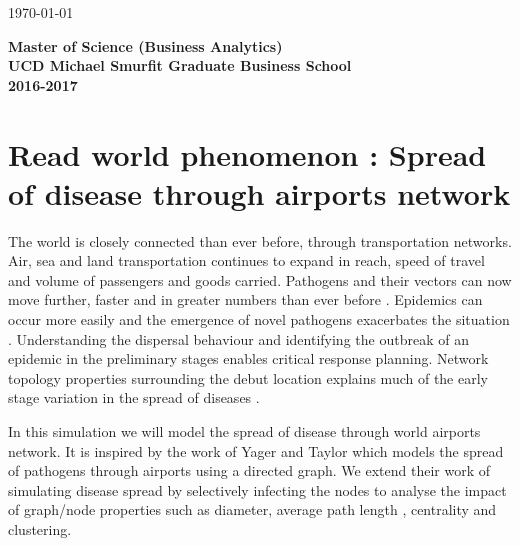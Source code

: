 \documentclass[a4paper,11pt]{article}
\begin{document}
\begin{titlepage}
{\large \today}\\[3cm] %


 

{

	 \vspace{1.5in}\textmd{\textbf{Master of Science (Business Analytics)}}\\
     \large{\textbf{UCD Michael Smurfit Graduate Business School }}\\
      \textmd{\textbf{2016-2017}}\\
 }     
\vfill %

\end{titlepage}






\section{Read world phenomenon : Spread of disease through airports network} 


The world is closely connected than ever before, through transportation networks. Air, sea and land transportation continues to expand in reach, speed of travel and volume of passengers and goods carried. Pathogens and their vectors can now move further, faster and in greater numbers than ever before \cite{tatem2006global}. Epidemics can occur more easily and the emergence of novel pathogens exacerbates the situation \cite{jones2008global}. Understanding the dispersal behaviour and identifying the outbreak of an epidemic in the preliminary stages enables critical response planning. Network topology properties surrounding the debut location explains much of the early stage variation in the spread of diseases \cite{lawyer2016measuring}.

In this simulation we will model the spread of disease through world airports network. It is inspired by the work of Yager and Taylor \cite{nicholasyager2014} which models the spread of pathogens through airports using a directed graph. We extend their work of simulating disease spread by selectively infecting the nodes to analyse the impact of graph/node properties such as diameter, average path length , centrality and clustering. 
\end{document}
